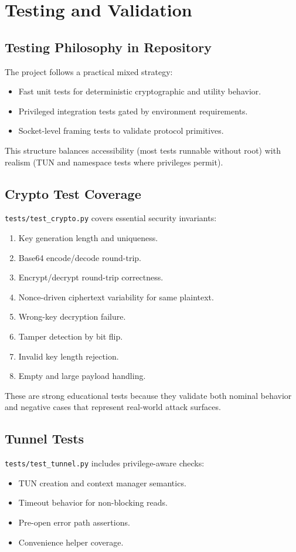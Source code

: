 \chapter{Testing and Validation}

\section{Testing Philosophy in Repository}
The project follows a practical mixed strategy:
\begin{itemize}[leftmargin=2em]
\item Fast unit tests for deterministic cryptographic and utility behavior.
\item Privileged integration tests gated by environment requirements.
\item Socket-level framing tests to validate protocol primitives.
\end{itemize}

This structure balances accessibility (most tests runnable without root) with realism (TUN and namespace tests where privileges permit).

\section{Crypto Test Coverage}
\texttt{tests/test\_crypto.py} covers essential security invariants:
\begin{enumerate}[leftmargin=2em]
\item Key generation length and uniqueness.
\item Base64 encode/decode round-trip.
\item Encrypt/decrypt round-trip correctness.
\item Nonce-driven ciphertext variability for same plaintext.
\item Wrong-key decryption failure.
\item Tamper detection by bit flip.
\item Invalid key length rejection.
\item Empty and large payload handling.
\end{enumerate}

These are strong educational tests because they validate both nominal behavior and negative cases that represent real-world attack surfaces.

\section{Tunnel Tests}
\texttt{tests/test\_tunnel.py} includes privilege-aware checks:
\begin{itemize}[leftmargin=2em]
\item TUN creation and context manager semantics.
\item Timeout behavior for non-blocking reads.
\item Pre-open error path assertions.
\item Convenience helper coverage.
\end{itemize}

